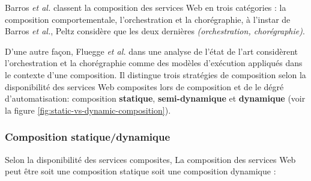     Barros \emph{et al.} \cite{barros2006standards} classent la
    composition des services Web en trois catégories : la composition
    comportementale, l'orchestration et la chorégraphie, à l'instar de
    Barros \emph{et al.}, Peltz \cite{peltz2003web} considère que les
    deux dernières \textit{(orchestration, chorégraphie)}.

    

    D'une autre façon, Fluegge \emph{et
      al.}\cite{fluegge2006challenges} dans une analyse de l'état de
    l'art considèrent l'orchestration et la chorégraphie comme des
    modèles d'exécution appliqués dans le contexte d'une
    composition. Il distingue trois stratégies de composition selon la
    disponibilité des services Web composites lors de composition et
    de le dégré d'automatisation: composition \textbf{statique},
    \textbf{semi-dynamique} et \textbf{dynamique} (voir la
    figure \ref{fig:static-vs-dynamic-composition}).

    


      \subsubsection{Composition statique/dynamique}
      \label{sec:comp-stat}
      Selon la disponibilité des services composites, La composition
      des services Web peut être soit une composition statique soit
      une composition dynamique \cite{driss2011approche}:

